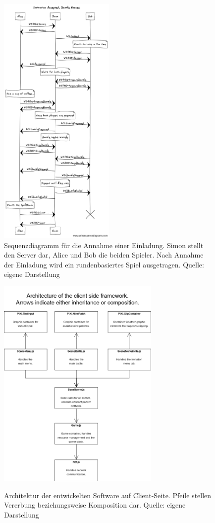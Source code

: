 \documentclass[ngerman,11pt]{report}
\begin{document}
\begin{figure}
\caption{Sequenzdiagramm für die Annahme einer Einladung. Simon stellt den Server dar, Alice und Bob die beiden Spieler. Nach Annahme der Einladung wird ein rundenbasiertes Spiel ausgetragen. Quelle: eigene Darstellung}
\centering
\includegraphics[width=0.5\textwidth]{InvitationAccepted}
\end{figure}

\begin{figure}
\caption{Architektur der entwickelten Software auf Client-Seite. Pfeile stellen Vererbung beziehungsweise Komposition dar. Quelle: eigene Darstellung}
\centering
\includegraphics[width=0.7\textwidth]{ClientFramework}
\label{fig:clientarch}
\end{figure}
\end{document}
